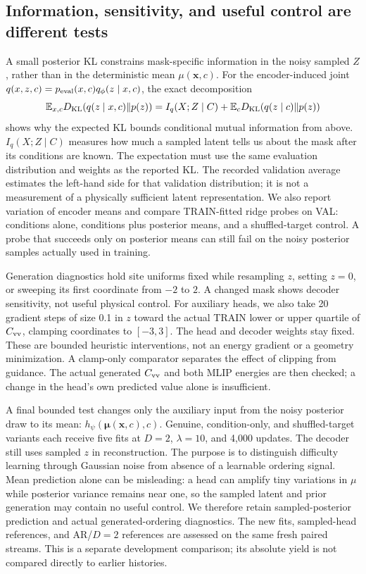 \documentclass[11pt]{article}
\newcommand{\E}{\mathbb E}
\newcommand{\KL}{D_{\rm KL}}
\begin{document}
\subsection{Information, sensitivity, and useful control are different tests}
A small posterior KL constrains mask-specific information in the noisy
sampled $Z$, rather than in the deterministic mean $\mu(\mathbf x,c)$.
For the encoder-induced joint
$q(x,z,c)=p_{\rm eval}(x,c)q_\phi(z\mid x,c)$, the exact decomposition
\begin{equation}
\E_{x,c}\KL(q(z\mid x,c)\|p(z))
=I_q(X;Z\mid C)+\E_c\KL(q(z\mid c)\|p(z))
\end{equation}
shows why the expected KL bounds conditional mutual information from above.
$I_q(X;Z\mid C)$ measures how much a sampled latent tells us about the mask
after its conditions are known. The expectation must use the same evaluation
distribution and weights as the reported KL.
The recorded validation average estimates the left-hand side for that
validation distribution; it is not a measurement of a physically sufficient
latent representation. We also report variation of encoder means and compare
TRAIN-fitted ridge probes on VAL: conditions alone, conditions plus posterior
means, and a shuffled-target control. A probe that succeeds only on posterior
means can still fail on the noisy posterior samples actually used in training.

Generation diagnostics hold site uniforms fixed while resampling $z$, setting
$z=0$, or sweeping its first coordinate from $-2$ to $2$. A changed mask shows
decoder sensitivity, not useful physical control. For auxiliary heads, we
also take 20 gradient steps of size 0.1 in $z$ toward the actual TRAIN lower
or upper quartile of $C_{\rm vv}$, clamping coordinates to $[-3,3]$. The head
and decoder weights stay fixed. These are bounded heuristic interventions,
not an energy gradient or a geometry minimization. A clamp-only comparator
separates the effect of clipping from guidance. The actual generated
$C_{\rm vv}$ and both MLIP energies are then checked; a change in the head's
own predicted value alone is insufficient.

A final bounded test changes only the auxiliary input from the noisy
posterior draw to its mean: $h_\psi(\boldsymbol\mu(\mathbf x,c),c)$. Genuine,
condition-only, and shuffled-target variants each receive five fits at
$D=2$, $\lambda=10$, and 4,000 updates. The decoder still uses sampled
$z$ in reconstruction. The purpose is to distinguish difficulty learning
through Gaussian noise from absence of a learnable ordering signal. Mean
prediction alone can be misleading: a head can amplify tiny variations in
$\mu$ while posterior variance remains near one, so the sampled latent and
prior generation may contain no useful control. We therefore retain
sampled-posterior prediction and actual generated-ordering diagnostics.
The new fits, sampled-head references, and AR/$D=2$ references are assessed
on the same fresh paired streams. This is a separate development comparison;
its absolute yield is not compared directly to earlier histories.
\end{document}

